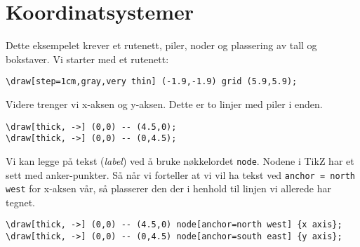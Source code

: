 \documentclass[12pt, a4paper]{article}
\begin{document}
\section*{Koordinatsystemer}
Dette eksempelet krever et rutenett, piler, noder og plassering av tall og bokstaver. Vi starter med et rutenett:

\begin{center}
\end{center}

\begin{Verbatim}[fontsize=\small]
\draw[step=1cm,gray,very thin] (-1.9,-1.9) grid (5.9,5.9);
\end{Verbatim}

\noindent Videre trenger vi x-aksen og y-aksen. Dette er to linjer med piler i enden.
\begin{center}
\end{center}

\begin{Verbatim}[fontsize=\small]
\draw[thick, ->] (0,0) -- (4.5,0);
\draw[thick, ->] (0,0) -- (0,4.5);
\end{Verbatim}
\newpage

Vi kan legge på tekst (\textit{label}) ved å bruke nøkkelordet \texttt{node}. Nodene i TikZ har et sett med anker-punkter. Så når vi forteller at vi vil ha tekst ved \texttt{anchor = north west} for x-aksen vår, så plasserer den der i henhold til linjen vi allerede har tegnet.

\begin{center}
\end{center}

\begin{Verbatim}[fontsize=\small]
\draw[thick, ->] (0,0) -- (4.5,0) node[anchor=north west] {x axis};
\draw[thick, ->] (0,0) -- (0,4.5) node[anchor=south east] {y axis};
\end{Verbatim}
\end{document}
